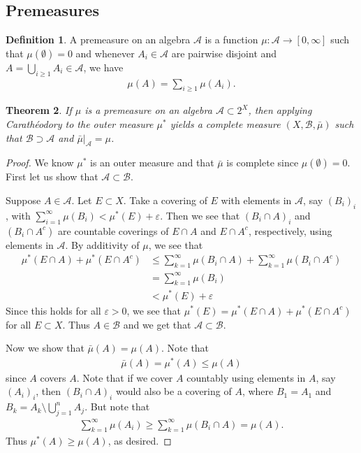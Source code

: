 \documentclass[11pt]{amsart}
\newtheorem{theorem}{Theorem}[section]
\theoremstyle{definition}
\newtheorem{definition}[theorem]{Definition}
\numberwithin{equation}{section}
\begin{document}
\subsection{Premeasures}
\begin{definition}
    A premeasure on an algebra $\mathcal A$ is a function $\mu:\mathcal A\to[0,\infty]$ such that $\mu(\emptyset)=0$ and whenever $A_i\in\mathcal A$ are pairwise disjoint and $A=\bigcup_{i\ge 1}A_i\in\mathcal A$, we have
    \begin{align*}
        \mu(A)=\sum_{i\ge 1}\mu(A_i).
    \end{align*}
\end{definition}
\begin{theorem}\label{extension}
    If $\mu$ is a premeasure on an algebra $\mathcal A\subset 2^X$, then applying Carathéodory to the outer measure $\mu^*$ yields a complete measure $(X,\mathcal B,\bar\mu)$ such that $\mathcal B\supset \mathcal A$ and $\bar\mu|_\mathcal A=\mu$.
\end{theorem}
\begin{proof}
    We know $\mu^*$ is an outer measure and that $\bar\mu$ is complete since $\mu(\emptyset)=0$. First let us show that $\mathcal A\subset\mathcal B$.

    Suppose $A\in\mathcal A$. Let $E\subset X$. Take a covering of $E$ with elements in $\mathcal A$, say $(B_i)_i$, with $\sum_{i=1}^\infty\mu(B_i)<\mu^*(E)+{\varepsilon}$. Then we see that $(B_i\cap A)_i$ and $(B_i\cap A^c)$ are countable coverings of $E\cap A$ and $E\cap A^c$, respectively, using elements in $\mathcal A$. By additivity of $\mu$, we see that 
    \begin{align*}
        \mu^*(E\cap A)+\mu^*(E\cap A^c)&\le\sum_{k=1}^\infty\mu(B_i\cap A)+\sum_{k=1}^\infty\mu(B_i\cap A^c)\\
        &=\sum_{k=1}^\infty\mu(B_i)\\
        &<\mu^*(E)+\varepsilon
    \end{align*}
    Since this holds for all $\varepsilon>0$, we see that $\mu^*(E)=\mu^*(E\cap A)+\mu^*(E\cap A^c)$ for all $E\subset X$. Thus $A\in\mathcal B$ and we get that $\mathcal A\subset\mathcal B$.

    Now we show that $\bar\mu(A)=\mu(A)$. Note that
    \begin{align*}
        \bar\mu(A)=\mu^*(A)\le\mu(A)
    \end{align*}
    since $A$ covers $A$. Note that if we cover $A$ countably using elements in $A$, say $(A_i)_i$, then $(B_i\cap A)_i$ would also be a covering of $A$, where $B_1=A_1$ and $B_k=A_k\setminus\bigcup_{j=1}^nA_j$. But note that
    \begin{align*}
        \sum_{k=1}^\infty\mu(A_i)\ge\sum_{k=1}^\infty\mu(B_i\cap A)=\mu(A).
    \end{align*}
    Thus $\mu^*(A)\ge\mu(A)$, as desired.
\end{proof}
\end{document}
